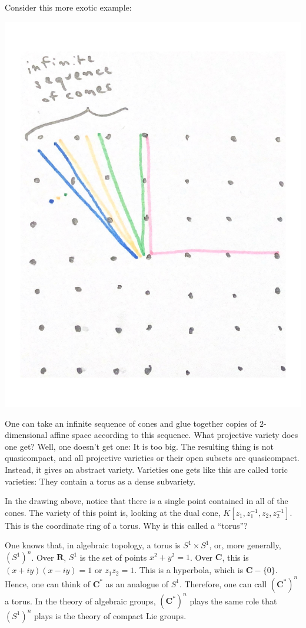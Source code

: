 \documentclass [11 pt, oneside] {article}
\begin{document}
Consider this more exotic example:
\begin{center}
	{\includegraphics[scale=0.4]{images/cone_seq}}
\end{center}
One can take an infinite sequence of cones and glue together copies of $2$-dimensional affine space according to this sequence. What projective variety does one get? Well, one doesn't get one: It is too big. The resulting thing is not quasicompact, and all projective varieties or their open subsets are quasicompact. Instead, it gives an abstract variety. Varieties one gets like this are called toric varieties: They contain a torus as a dense subvariety.

In the drawing above, notice that there is a single point contained in all of the cones. The variety of this point is, looking at the dual cone, $K[z_1,z_1^{-1},z_2,z_2^{-1}]$. This is the coordinate ring of a torus. Why is this called a ``torus''?

One knows that, in algebraic topology, a torus is $S^1\times S^1$, or, more generally, $(S^1)^n$. Over $\mathbf{R}$, $S^1$ is the set of points $x^2 + y^2 = 1$. Over $\mathbf{C}$, this is $(x+iy) (x-iy)=1$ or $z_1z_2=1$. This is a hyperbola, which is $\mathbf{C}-\{0\}$. Hence, one can think of $\mathbf{C}^*$ as an analogue of $S^1$. Therefore, one can call $(\mathbf{C}^*)^n$ a torus. In the theory of algebraic groups, $(\mathbf{C}^*)^n$ plays the same role that $(S^1)^n$ plays is the theory of compact Lie groups. 
\end{document}
